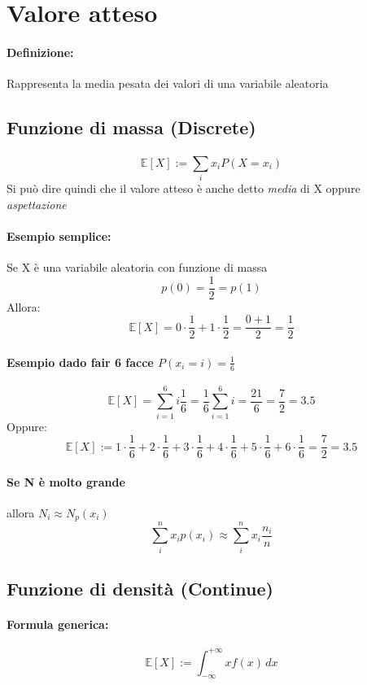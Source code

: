 \documentclass[]{article}
\newcommand{\ev}{\mathbb{E}[X]}
\renewcommand{\ev}[1]{\mathbb{E}[#1]}
\newcommand{\definizione}{\paragraph{Definizione:}}
\newcommand{\formula}{\paragraph{Formula generica:}}
\begin{document}
    \newpage
    \section{Valore atteso}
    \definizione Rappresenta la media pesata dei valori di una variabile aleatoria

    \subsection{Funzione di massa (Discrete)}
    \[ \ev{X} := \sum_{i}^{} x_i P(X = x_i) \]
    Si può dire quindi che il valore atteso è anche detto \textit{media} di X oppure \textit{aspettazione}

    \paragraph{Esempio semplice:} Se X è una variabile aleatoria con funzione di massa
    \[ p(0) = \frac{1}{2} = p(1) \]
    Allora:
    \[ \ev{X} = 0 \cdot \frac{1}{2} + 1 \cdot \frac{1}{2} = \frac{0+1}{2} = \frac{1}{2}\]

    \paragraph{Esempio dado fair 6 facce $P(x_i = i) = \frac{1}{6}$}
    \[ \ev{X} = \sum_{i=1}^{6} i \frac{1}{6} = \frac{1}{6} \sum_{i=1}^{6} i = \frac{21}{6} = \frac{7}{2} = 3.5 \]
    Oppure:
    \[ \ev{X} := 1 \cdot \frac{1}{6} + 2 \cdot \frac{1}{6} + 3 \cdot \frac{1}{6} + 4 \cdot \frac{1}{6} + 5 \cdot \frac{1}{6} + 6 \cdot \frac{1}{6} = \frac{7}{2} = 3.5 \]

    \paragraph{Se N è molto grande} allora \textbf{$N_i \approx N_p(x_i)$}
    \[ \sum_{i}^{n} x_i p(x_i) \approx \sum_{i}^{n} x_i \frac{n_i}{n}\]
    
    
    \subsection{Funzione di densità (Continue)}
    \formula \[ \ev{X} := \int_{-\infty}^{+\infty} x f(x) \, dx \]
\end{document}
